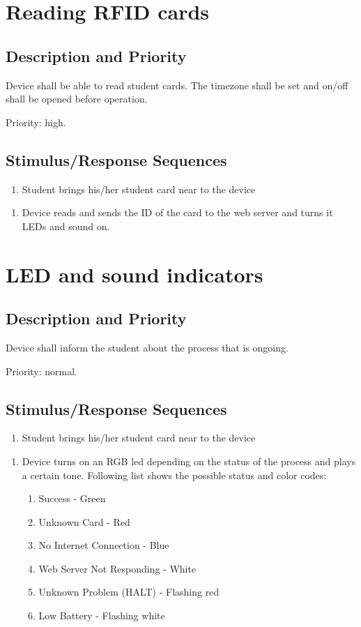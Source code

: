 \documentclass{scrreprt}
\newcommand{\stimulus}[1] {
  \begin{enumerate}[leftmargin=5.7\parindent, label=Stimulus:]
  \item #1
  \end{enumerate}
  
  }
\newcommand{\response}[1] {
  \smallskip
  \begin{enumerate}[leftmargin=6\parindent, label=Response:]
  \item #1
  \end{enumerate}
  }
\begin{document}
\section{Reading RFID cards}

\subsection{Description and Priority}
Device shall be able to read student cards. The timezone shall be set and on/off shall be opened before operation.

\vspace{2mm}
Priority: high.

\subsection{Stimulus/Response Sequences}

\stimulus{Student brings his/her student card near to the device}
\response{ Device reads and sends the ID of the card to the web server and turns it LEDs and sound on.}

\section{LED and sound indicators}
\subsection{Description and Priority}
Device shall inform the student about the process that is ongoing.

\vspace{2mm}
Priority: normal.

\subsection{Stimulus/Response Sequences}

\stimulus{Student brings his/her student card near to the device}
\response{ Device turns on an RGB led depending on the status of the process and plays a certain tone. Following list shows the possible status and color codes:

\begin{enumerate}[leftmargin=10\parindent, label=\arabic*.]
  \item Success - Green
  \item Unknown Card - Red
  \item No Internet Connection - Blue
  \item Web Server Not Responding - White
  \item Unknown Problem (HALT) - Flashing red
  \item Low Battery - Flashing white
\end{enumerate}

}
\end{document}
